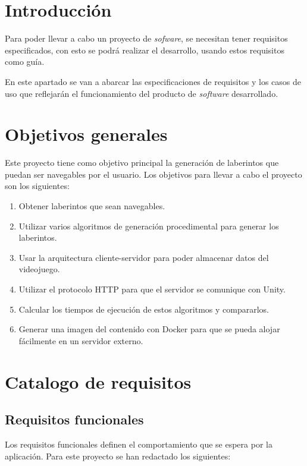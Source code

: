 
\section{Introducción}
Para poder llevar a cabo un proyecto de \textit{sofware}, se necesitan tener requisitos especificados, con esto se podrá realizar el desarrollo, usando estos requisitos como guía.

En este apartado se van a abarcar las especificaciones de requisitos y los casos de uso que reflejarán el funcionamiento del producto de \textit{software} desarrollado.

\section{Objetivos generales}
Este proyecto tiene como objetivo principal la generación de laberintos que puedan ser navegables por el usuario. Los objetivos para llevar a cabo el proyecto son los siguientes:
\begin{enumerate}
    \item Obtener laberintos que sean navegables.
    \item Utilizar varios algoritmos de generación procedimental para generar los laberintos.
    \item Usar la arquitectura cliente-servidor para poder almacenar datos del videojuego.
    \item Utilizar el protocolo HTTP para que el servidor se comunique con Unity.
    \item Calcular los tiempos de ejecución de estos algoritmos y compararlos.
    \item Generar una imagen del contenido con Docker para que se pueda alojar fácilmente en un servidor externo.
\end{enumerate}


\section{Catalogo de requisitos}

\subsection{Requisitos funcionales}
Los requisitos funcionales definen el comportamiento que se espera por la aplicación. Para este proyecto se han redactado los siguientes:


